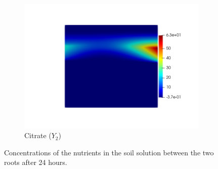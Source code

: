 \documentclass[11pt]{article}
\numberwithin{equation}{section}
\begin{document}
\begin{figure}[!htb]
\begin{subfigure}[t]{0.3\textwidth}
    \includegraphics[trim=100 100 70 100,width=\textwidth]{Figures/Y2.png}
    \caption{Citrate ($Y_2$)}
\end{subfigure}
\caption{Concentrations of the nutrients in the soil solution between the two roots after 24 hours.}
\end{figure}

\FloatBarrier
\end{document}
